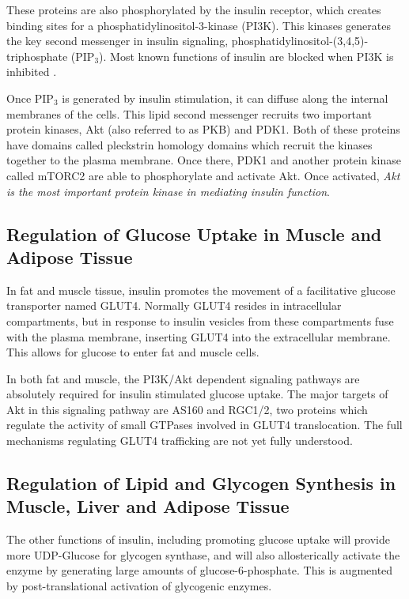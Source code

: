 \documentclass{tufte-handout}
\begin{document}
These proteins are also phosphorylated by the insulin receptor, which creates binding sites for a phosphatidylinositol-3-kinase (PI3K).  This kinases generates the key second messenger in insulin signaling, phosphatidylinositol-(3,4,5)-triphosphate (PIP$_3$).  Most known functions of insulin are blocked when PI3K is inhibited \cite{Kanai1993}.

Once PIP$_3$ is generated by insulin stimulation, it can diffuse along the internal membranes of the cells.  This lipid second messenger recruits two important protein kinases, Akt (also referred to as PKB) and PDK1.  Both of these proteins have domains called pleckstrin homology domains which recruit the kinases together to the plasma membrane.  Once there, PDK1 and another protein kinase called mTORC2 are able to phosphorylate and activate Akt.  Once activated, \emph{Akt is the most important protein kinase in mediating insulin function}.

\subsection{Regulation of Glucose Uptake in Muscle and Adipose Tissue}

In fat and muscle tissue, insulin promotes the movement of a facilitative glucose transporter named GLUT4.  Normally GLUT4 resides in intracellular compartments, but in response to insulin vesicles from these compartments fuse with the plasma membrane, inserting GLUT4 into the extracellular membrane.  This allows for glucose to enter fat and muscle cells.

In both fat and muscle, the PI3K/Akt dependent signaling pathways are absolutely required for insulin stimulated glucose uptake.  The major targets of Akt in this signaling pathway are AS160 and RGC1/2, two proteins which regulate the activity of small GTPases involved in GLUT4 translocation.  The full mechanisms regulating GLUT4 trafficking are not yet fully understood.

\subsection{Regulation of Lipid and Glycogen Synthesis in Muscle, Liver and Adipose Tissue}

The other functions of insulin, including promoting glucose uptake will provide more UDP-Glucose for glycogen synthase, and will also allosterically activate the enzyme by generating large amounts of glucose-6-phosphate.  This is augmented by post-translational activation of glycogenic enzymes.
\end{document}
